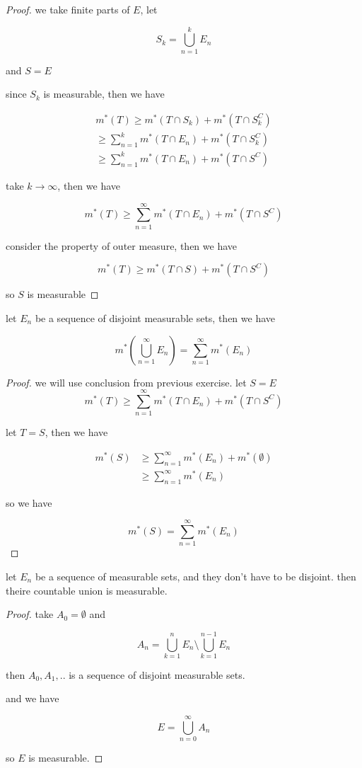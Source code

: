 \documentclass[11pt,a4paper]{article}
\begin{document}
\begin{proof}
    we take finite parts of $E$, let 

    \[
        S_k = \bigcup_{n=1}^{k}E_n
    \]

    and $S = E$


    since $S_k$ is measurable, then we have

    \begin{align*}
        m^*(T) \ge m^*(T \cap S_k) + m^*(T \cap S_k^C) \\
        \ge \sum_{n=1}^{k}m^*(T \cap E_n) + m^*(T \cap S_k^C) \\
        \ge \sum_{n=1}^{k}m^*(T \cap E_n) + m^*(T \cap S^C)
    \end{align*}

    take $k \to \infty$, then we have

    \[
        m^*(T) \ge \sum_{n=1}^{\infty}m^*(T \cap E_n) + m^*(T \cap S^C)
    \]
    
    consider the property of outer measure, then we have

    \[
        m^*(T) \ge m^*(T \cap S) + m^*(T \cap S^C)
    \]

    so $S$ is measurable
\end{proof}

\begin{exercise}
    let $E_n$ be a sequence of disjoint measurable sets, then we have

    \[
        m^*(\bigcup_{n=1}^{\infty}E_n) = \sum_{n=1}^{\infty}m^*(E_n)
    \]
\end{exercise}

\begin{proof}
    we will use conclusion from previous exercise. let $S=E$ 
    \[
        m^*(T) \ge \sum_{n=1}^{\infty}m^*(T \cap E_n) + m^*(T \cap S^C)
    \]

    let $T = S$, then we have

    \begin{align*}
        m^*(S) & \ge \sum_{n=1}^{\infty}m^*(E_n) + m^*(\emptyset) \\
        & \ge \sum_{n=1}^{\infty}m^*(E_n)
    \end{align*}

    so we have

    \[
        m^*(S) = \sum_{n=1}^{\infty}m^*(E_n)
    \]
\end{proof}

\begin{exercise}
    let $E_n$ be a sequence of measurable sets, and they don't have to be disjoint. then
    theire countable union is measurable.
\end{exercise}

\begin{proof}
    take  $A_0 = \emptyset$ and 

    \[
        A_{n} = \bigcup_{k=1}^{n}E_n \setminus \bigcup_{k=1}^{n-1}E_n
    \]

    then $A_0, A_1, ..$ is a sequence of disjoint measurable sets.

    and we have

    \[
        E = \bigcup_{n=0}^{\infty}A_n
    \]

    so $E$ is measurable.
\end{proof}
\end{document}
